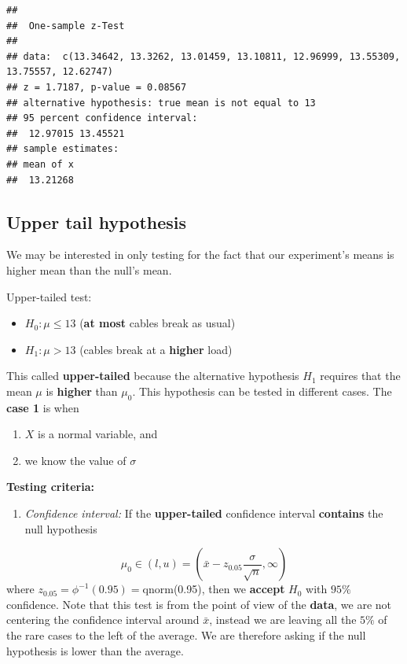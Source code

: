 \documentclass[
]{book}
\providecommand{\tightlist}{%
  \setlength{\itemsep}{0pt}\setlength{\parskip}{0pt}}
\begin{document}
\begin{verbatim}
## 
##  One-sample z-Test
## 
## data:  c(13.34642, 13.3262, 13.01459, 13.10811, 12.96999, 13.55309,     13.75557, 12.62747)
## z = 1.7187, p-value = 0.08567
## alternative hypothesis: true mean is not equal to 13
## 95 percent confidence interval:
##  12.97015 13.45521
## sample estimates:
## mean of x 
##  13.21268
\end{verbatim}

\hypertarget{upper-tail-hypothesis}{%
\subsection{Upper tail hypothesis}\label{upper-tail-hypothesis}}

We may be interested in only testing for the fact that our experiment's means is higher mean than the null's mean.

Upper-tailed test:

\begin{itemize}
\tightlist
\item
  \(H_0:\mu \leq 13\) (\textbf{at most} cables break as usual)
\item
  \(H_1:\mu > 13\) (cables break at a \textbf{higher} load)
\end{itemize}

This called \textbf{upper-tailed} because the alternative hypothesis \(H_1\) requires that the mean \(\mu\) is \textbf{higher} than \(\mu_0\). This hypothesis can be tested in different cases. The \textbf{case 1} is when

\begin{enumerate}
\def\labelenumi{\arabic{enumi}.}
\tightlist
\item
  \(X\) is a normal variable, and
\item
  we know the value of \(\sigma\)
\end{enumerate}

\textbf{Testing criteria:}

\begin{enumerate}
\def\labelenumi{\arabic{enumi}.}
\tightlist
\item
  \emph{Confidence interval:} If the \textbf{upper-tailed} confidence interval \textbf{contains} the null hypothesis
\end{enumerate}

\[\mu_0\in (l,u)=(\bar{x}-z_{0.05} \frac{\sigma}{\sqrt{n}}, \infty)\]
where \(z_{0.05}=\phi^{-1}(0.95)=\)qnorm(0.95), then we \textbf{accept} \(H_0\) with \(95\%\) confidence. Note that this test is from the point of view of the \textbf{data}, we are not centering the confidence interval around \(\bar{x}\), instead we are leaving all the \(5\%\) of the rare cases to the left of the average. We are therefore asking if the null hypothesis is lower than the average.
\end{document}
